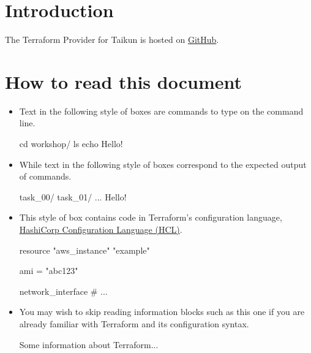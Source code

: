 \section{Introduction}

The Terraform Provider for Taikun is hosted on \href{https://github.com/itera-io/terraform-provider-taikun}{GitHub}.
\blindtext{}

\section{How to read this document}

\begin{itemize}
  \item Text in the following style of boxes are commands to type on the command line.
\begin{shell}
cd workshop/
ls
echo Hello!
\end{shell}
\item While text in the following style of boxes correspond to the expected output of commands.
\begin{raw}
task_00/
task_01/
...
Hello!
\end{raw}
\item This style of box contains code in Terraform's configuration language,
\href{https://www.terraform.io/docs/language/syntax/configuration.html}{HashiCorp Configuration Language (HCL)}.
\begin{tf}
resource "aws_instance" "example" {
  ami = "abc123"

  network_interface {
    # ...
  }
}
\end{tf}
\item You may wish to skip reading information blocks such as this one if you are already familiar with
Terraform and its configuration syntax.
\begin{info}
  Some information about Terraform...
\end{info}
\end{itemize}
